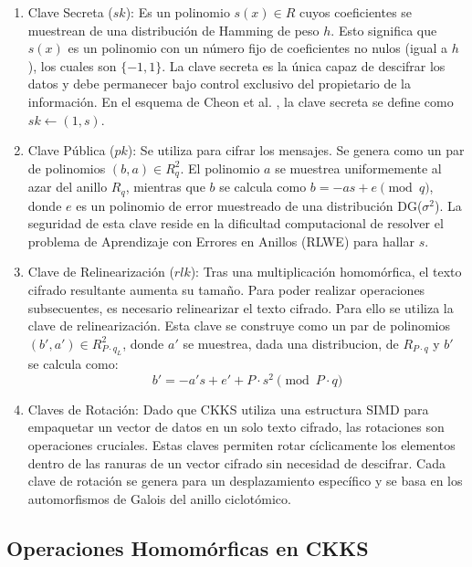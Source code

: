 \begin{enumerate}
   \item Clave Secreta ($sk$): Es un polinomio $s(x) \in R$ cuyos coeficientes se muestrean de una distribución de Hamming de peso $h$. Esto significa que $s(x)$ es un polinomio con un número fijo de coeficientes no nulos (igual a $h$), los cuales son $\{-1, 1\}$. La clave secreta es la única capaz de descifrar los datos y debe permanecer bajo control exclusivo del propietario de la información. En el esquema de Cheon et al. \cite{CKKS17}, la clave secreta se define como $sk \leftarrow (1, s)$.
   
   \item Clave Pública ($pk$): Se utiliza para cifrar los mensajes. Se genera como un par de polinomios $(b, a) \in R_q^2$. El polinomio $a$ se muestrea uniformemente al azar del anillo $R_q$, mientras que $b$ se calcula como $b = -as + e \pmod q$, donde $e$ es un polinomio de error muestreado de una distribución DG($\sigma^2$). La seguridad de esta clave reside en la dificultad computacional de resolver el problema de Aprendizaje con Errores en Anillos (RLWE) para hallar $s$.
   
   \item Clave de Relinearización ($rlk$): Tras una multiplicación homomórfica, el texto cifrado resultante aumenta su tamaño. Para poder realizar operaciones subsecuentes, es necesario relinearizar el texto cifrado. Para ello se utiliza la clave de relinearización. Esta clave se construye como un par de polinomios $(b', a') \in R_{P \cdot q_L}^2$, donde $a'$ se muestrea, dada una distribucion, de $R_{P \cdot q}$ y $b'$ se calcula como:
   $$ b' = -a's + e' + P \cdot s^2 \pmod{P \cdot q} $$

   \item Claves de Rotación: Dado que CKKS utiliza una estructura SIMD para empaquetar un vector de datos en un solo texto cifrado, las rotaciones son operaciones cruciales. Estas claves permiten rotar cíclicamente los elementos dentro de las ranuras de un vector cifrado sin necesidad de descifrar. Cada clave de rotación se genera para un desplazamiento específico y se basa en los automorfismos de Galois del anillo ciclotómico.
\end{enumerate}

\subsection{Operaciones Homomórficas en CKKS}

